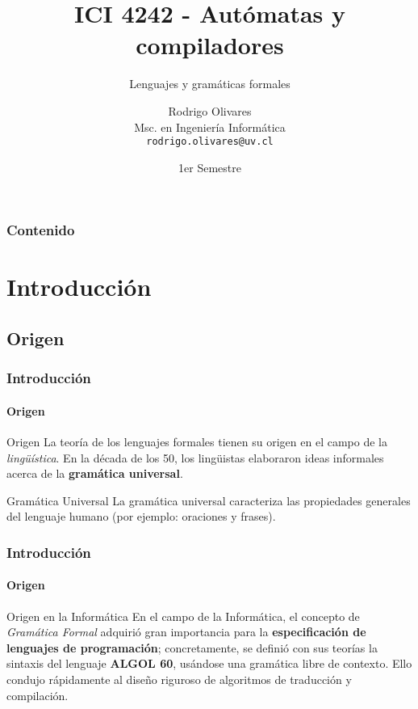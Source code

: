 \documentclass{beamer}
\title[\textbf{ICI 4242 - Aut\'omatas y compiladores}]{\textbf{ICI 4242 - Aut\'omatas y compiladores}}
\subtitle{Lenguajes y gram\'aticas formales}
\author[Rodrigo Olivares]
{
	Rodrigo Olivares \\
	\vspace{0.5mm}
	Msc. en Ingenier\'ia Inform\'atica \\
	\vspace{0.5mm}
	\texttt{\normalsize rodrigo.olivares@uv.cl}
}
\institute[PUCV]
\date{1er Semestre}
\begin{document}
	\begin{frame}
		\titlepage
	\end{frame}

	\begin{frame}
		\frametitle{Contenido}
		\tableofcontents[pausesections]
	\end{frame}

	\section{Introducci\'on}

		\subsection{Origen}

		\begin{frame}
			\frametitle{Introducci\'on}
			\framesubtitle{Origen}

			\begin{block}{Origen}
			    La teor\'ia de los lenguajes formales tienen su origen en el campo de la \emph{ling\"u\'istica}. En la d\'ecada de los 50, los ling\"uistas elaboraron ideas informales acerca de la \textbf{gram\'atica universal}. 
			\end{block}
			\begin{alertblock}{Gram\'atica Universal}
			    La gram\'atica universal caracteriza las propiedades generales del lenguaje humano (por ejemplo: oraciones y frases).
			\end{alertblock}
		\end{frame}

        \begin{frame}
            \frametitle{Introducci\'on}
            \framesubtitle{Origen}

            \begin{alertblock}{Origen en la Inform\'atica}
                En el campo de la Inform\'atica, el concepto de \emph{Gram\'atica Formal} adquiri\'o gran importancia para la \textbf{especificaci\'on de lenguajes de programaci\'on}; concretamente, se defini\'o con sus teor\'ias la sintaxis del lenguaje \textbf{ALGOL 60}, us\'andose una gram\'atica libre de contexto. Ello condujo r\'apidamente al dise\~no riguroso de algoritmos de traducci\'on y compilaci\'on.
			\end{alertblock}
		\end{frame}
\end{document}

